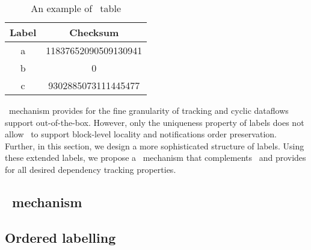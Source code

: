 \begin{table}
\caption{An example of \acker\ table}
    \begin{center}
        \begin{tabular}{ |c|c| } 
         \hline
         Label & Checksum \\ 
         \hline
         a & 11837652090509130941 \\ 
         b & 0 \\
         c & 9302885073111445477 \\
         \hline
        \end{tabular}
    \end{center}
\label{ack_table}
\end{table}

\acker\ mechanism provides for the fine granularity of tracking and cyclic dataflows support out-of-the-box. However, only the uniqueness property of labels does not allow \acker\ to support block-level locality and notifications order preservation. Further, in this section, we design a more sophisticated structure of labels. Using these extended labels, we propose a \tracker\ mechanism that complements \acker\ and provides for all desired dependency tracking properties. 

\subsection{\tracker\ mechanism}

\subsection{Ordered labelling}





